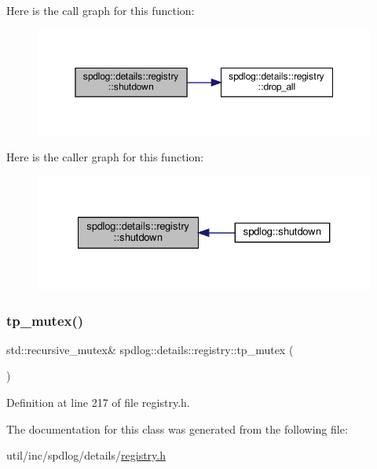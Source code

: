 Here is the call graph for this function\+:
\nopagebreak
\begin{figure}[H]
\begin{center}
\leavevmode
\includegraphics[width=350pt]{classspdlog_1_1details_1_1registry_ac93f888f316b0488414771ad6533b6a9_cgraph}
\end{center}
\end{figure}
Here is the caller graph for this function\+:
\nopagebreak
\begin{figure}[H]
\begin{center}
\leavevmode
\includegraphics[width=327pt]{classspdlog_1_1details_1_1registry_ac93f888f316b0488414771ad6533b6a9_icgraph}
\end{center}
\end{figure}
\mbox{\label{classspdlog_1_1details_1_1registry_a0fddfd080598f35c675d618cb5e414c6}} 
\subsubsection{\texorpdfstring{tp\+\_\+mutex()}{tp\_mutex()}}
{\footnotesize\ttfamily std\+::recursive\+\_\+mutex\& spdlog\+::details\+::registry\+::tp\+\_\+mutex (\begin{DoxyParamCaption}{ }\end{DoxyParamCaption})\hspace{0.3cm}{\ttfamily [inline]}}



Definition at line 217 of file registry.\+h.



The documentation for this class was generated from the following file\+:\begin{DoxyCompactItemize}
\item 
util/inc/spdlog/details/\hyperlink{registry_8h}{registry.\+h}\end{DoxyCompactItemize}
